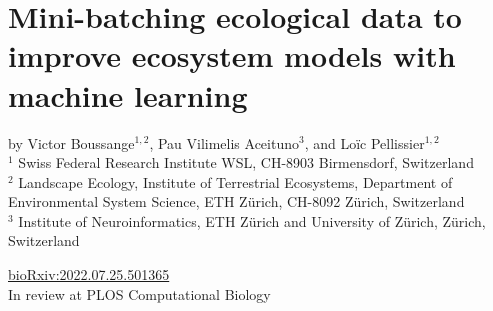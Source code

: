\newcommand{\perr}{|\nicefrac{(\hat p -\Tilde{p})}{\Tilde{p}}|}
\newcommand{\by}{\textbf{y}}
\newcommand{\AIC}{\text{AIC}}
\newcommand{\M}{\mathcal{M}}

\graphicspath{{./content/chap3_mini-batching/}}

%
\chapter{Mini-batching ecological data to improve ecosystem models with machine learning}
\label{chap:mini-batching}

by Victor Boussange$^{1,2}$, 
Pau Vilimelis Aceituno$^{3}$, 
and 
Loïc Pellissier$^{1,2}$\bigskip
\\
$^1$ \small{Swiss Federal Research Institute WSL, CH-8903 Birmensdorf, Switzerland}\smallskip\\
$^2$ \small{Landscape Ecology, Institute of Terrestrial Ecosystems, Department of Environmental System Science, ETH Zürich, CH-8092 Zürich, Switzerland}\smallskip\\
$^3$ \small{Institute of Neuroinformatics, ETH Zürich and University of Zürich, Zürich, Switzerland}\smallskip

\begin{center}
    \href{https://www.biorxiv.org/content/10.1101/2022.07.25.501365v1}{bioRxiv:2022.07.25.501365}\\
    In review at PLOS Computational Biology
\end{center}

